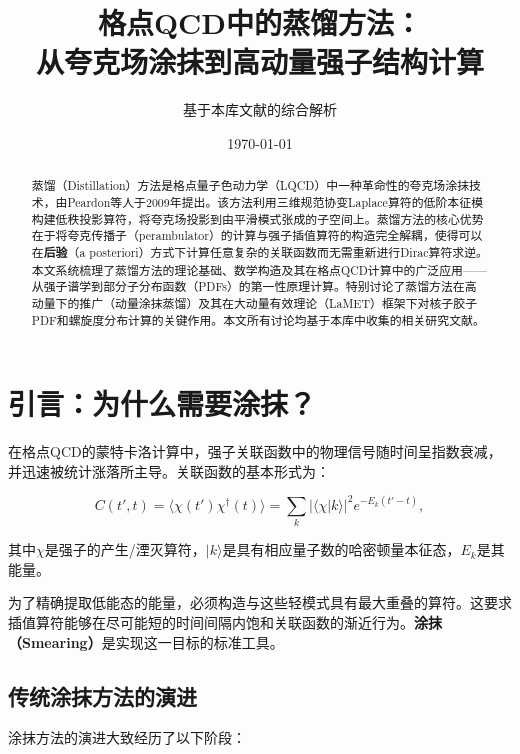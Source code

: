 \documentclass[12pt,a4paper]{ctexart}
\title{\heiti 格点QCD中的蒸馏方法：\\
从夸克场涂抹到高动量强子结构计算}
\author{基于本库文献的综合解析}
\date{\today}
\theoremstyle{definition}
\begin{document}
\maketitle

\begin{abstract}
\noindent
蒸馏（Distillation）方法是格点量子色动力学（LQCD）中一种革命性的夸克场涂抹技术，由Peardon等人于2009年提出。该方法利用三维规范协变Laplace算符的低阶本征模构建低秩投影算符，将夸克场投影到由平滑模式张成的子空间上。蒸馏方法的核心优势在于将夸克传播子（perambulator）的计算与强子插值算符的构造完全解耦，使得可以在\textbf{后验}（a posteriori）方式下计算任意复杂的关联函数而无需重新进行Dirac算符求逆。本文系统梳理了蒸馏方法的理论基础、数学构造及其在格点QCD计算中的广泛应用——从强子谱学到部分子分布函数（PDFs）的第一性原理计算。特别讨论了蒸馏方法在高动量下的推广（动量涂抹蒸馏）及其在大动量有效理论（LaMET）框架下对核子胶子PDF和螺旋度分布计算的关键作用。本文所有讨论均基于本库中收集的相关研究文献。
\end{abstract}

\tableofcontents
\newpage

\section{引言：为什么需要涂抹？}

在格点QCD的蒙特卡洛计算中，强子关联函数中的物理信号随时间呈指数衰减，并迅速被统计涨落所主导\cite{Peardon2009}。关联函数的基本形式为：

\begin{equation}
C(t', t) = \langle \chi(t') \chi^\dagger(t) \rangle = \sum_k |\langle \chi|k\rangle|^2 e^{-E_k(t'-t)},
\label{eq:correlator}
\end{equation}

其中$\chi$是强子的产生/湮灭算符，$|k\rangle$是具有相应量子数的哈密顿量本征态，$E_k$是其能量。

为了精确提取低能态的能量，必须构造与这些轻模式具有最大重叠的算符。这要求插值算符能够在尽可能短的时间间隔内饱和关联函数的渐近行为。\textbf{涂抹（Smearing）}是实现这一目标的标准工具\cite{UKQCD1993}。

\subsection{传统涂抹方法的演进}

涂抹方法的演进大致经历了以下阶段\cite{UKQCD1993}：
\end{document}
